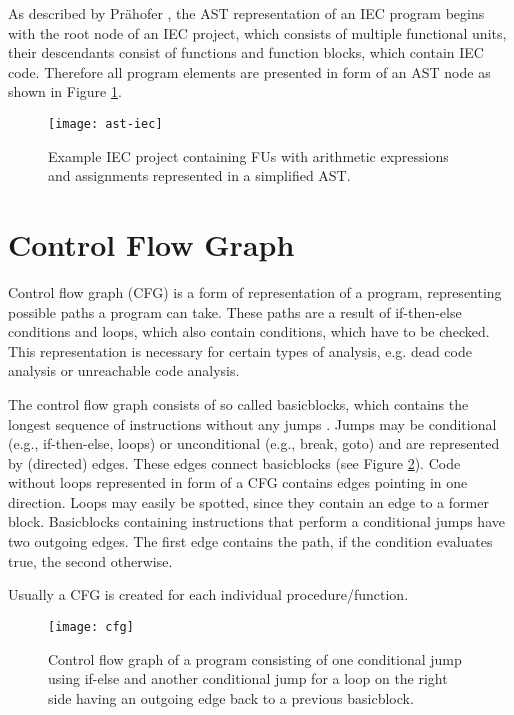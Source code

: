 As described by Prähofer \cite{Prahofer_2012}, the AST representation of an IEC program begins with the root node of an IEC project, which consists of multiple functional units, their descendants consist of functions and function blocks, which contain IEC code. Therefore all program elements are presented in form of an AST node as shown in Figure \ref{fig:ast basics}.

\begin{figure}[h!]
	\centering
	\texttt{[image: ast-iec]}
	\caption{Example IEC project containing FUs with arithmetic expressions and assignments represented in a simplified AST.}
	\label{fig:ast basics}
\end{figure}

\section{Control Flow Graph}
\label{sub:cfg}
Control flow graph (CFG) is a form of representation of a program, representing possible paths a program can take. These paths are a result of if-then-else conditions and loops, which also contain conditions, which have to be checked. 
This representation is necessary for certain types of analysis, e.g. dead code analysis or unreachable code analysis.

The control flow graph consists of so called basicblocks, which contains the longest sequence of instructions without any jumps \cite{Prahofer_2012}. Jumps may be conditional (e.g., if-then-else, loops) or unconditional (e.g., break, goto) and are represented by (directed) edges. These edges connect basicblocks (see Figure \ref{fig:cfg basics}). Code without loops represented in form of a CFG contains edges pointing in one direction. Loops may easily be spotted, since they contain an edge to a former block. Basicblocks containing instructions that perform a conditional jumps have two outgoing edges. The first edge contains the path, if the condition evaluates true, the second otherwise. 

Usually a CFG is created for each individual procedure/function. 

\begin{figure}[h!]
	\centering
	\texttt{[image: cfg]}
	\caption{Control flow graph of a program consisting of one conditional jump using if-else and another conditional jump for a loop on the right side having an outgoing edge back to a previous basicblock.}
	\label{fig:cfg basics}
\end{figure}

